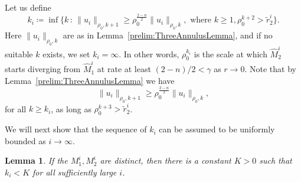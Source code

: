 \documentclass[12pt, reqno ]{amsart}
\newtheorem{lemma}[theorem]{Lemma}
\numberwithin{equation}{section}
\begin{document}
Let us define
\[ k_i\coloneqq \inf\{ k\,:\,  \|u_i\|_{\rho_0,  k+1}\geq \rho_0^{\frac{2-n}{2}}\|u_i\|_{\rho_0,k}, \text{ where } k\geq 1, \rho_0^{k+2} > \tilde{r}^i_2 \}. \]
Here  $\|u_i\|_{\rho_0, k}$ are as in Lemma~\ref{prelim:ThreeAnnulusLemma}, and if no suitable $k$ exists, we set $k_i=\infty$. In other words, 
$\rho_0^{k_i}$ is the scale at which $\hat{M}^i_2$ starts diverging  from $\hat{M}^i_1$ at rate at least $(2-n)/2 < \gamma$ as $r\to 0$. Note that by Lemma~\ref{prelim:ThreeAnnulusLemma} we have 
\begin{equation} \label{eq:uigrowth}
\|u_i\|_{\rho_0,  k+1}\geq \rho_0^{\frac{2-n}{2}}\|u_i\|_{\rho_0,k}, 
\end{equation}
for all $k\geq k_i$, as long as $\rho_0^{k+3} > \tilde{r}^i_2$.

We will next show that the sequence of $k_i$ can be assumed to be uniformly bounded as $i\to\infty$. 
\begin{lemma}\label{lemma:k_i bounded}
    If the $M^i_1, M^i_2$ are distinct, then 
    there is a constant $K > 0$ such that $k_i < K$ for all sufficiently large $i$. 
\end{lemma}
\end{document}
